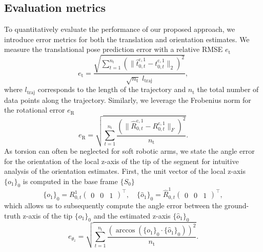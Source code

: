 \subsection{Evaluation metrics}
To quantitatively evaluate the performance of our proposed approach, we introduce error metrics for both the translation and orientation estimates.
%
We measure the translational pose prediction error with a relative \gls{RMSE} $e_\mathrm{t}$
\begin{equation}\label{eq:srslam:evaluation_translational_error}
    e_\mathrm{t} = \frac{\sqrt{\sum_{t=1}^{n_\mathrm{t}} \left (\lVert \hat{t}_{0,t}^{\mathrm{c},1} - t_{0,t}^{\mathrm{c},1} \rVert_2 \right )^2}}{\sqrt{n_\mathrm{t}} \; l_\mathrm{traj}},
\end{equation}
where $l_\mathrm{traj}$ corresponds to the length of the trajectory and $n_\mathrm{t}$ the total number of data points along the trajectory. Similarly, we leverage the Frobenius norm for the rotational error $e_\mathrm{R}$
\begin{equation}\label{eq:srslam:evaluation_rotational_error}
    e_\mathrm{R} = \sqrt{\sum_{t=1}^{n_\mathrm{t}} \frac{\left (\big\lVert \hat{R}_{0,t}^{\mathrm{c},1} - R_{0,t}^{\mathrm{c},1} \big\rVert_F \right )^2}{n_\mathrm{t}}}.
\end{equation}
As torsion can often be neglected for soft robotic arms, we state the angle error for the orientation of the local z-axis of the tip of the segment for intuitive analysis of the orientation estimates. First, the unit vector of the local z-axis $\{ o_{1} \}_{0}$ is computed in the base frame $\{ S_0 \}$
\begin{equation}
    \{ o_1 \}_0 = R_{0,t}^{1}\begin{pmatrix}0 & 0 & 1\end{pmatrix}^\top,
    \quad
    \{ \hat{o}_1 \}_0 = \hat{R}_{0,t}^{1}\begin{pmatrix}0 & 0 & 1\end{pmatrix}^\top,
\end{equation}
which allows us to subsequently compute the angle error between the ground-truth z-axis of the tip $\{ o_1 \}_0$ and the estimated z-axis $ \{ \hat{o}_1 \}_0$
\begin{equation}\label{eq:srslam:evaluation_angle_error}
    e_{\theta_z} = \sqrt{\sum_{t=1}^{n_\mathrm{t}} \frac{\left (\arccos \left ( \{ o_1 \}_0 \cdot \{ \hat{o}_1 \}_0 \right ) \right )^2}{n_\mathrm{t}}}.
\end{equation}

